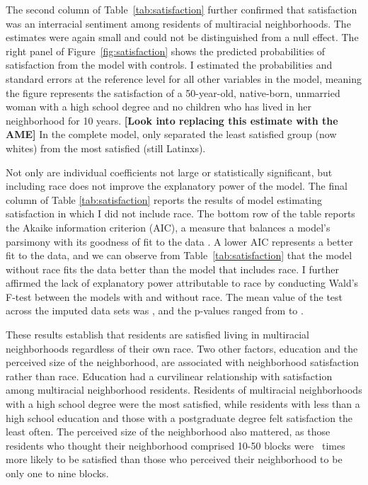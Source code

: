 \documentclass{baderart}
\begin{document}

The second column of Table~\ref{tab:satisfaction} further confirmed that satisfaction was an interracial sentiment among residents of multiracial neighborhoods. The estimates were again small and could not be distinguished from a null effect. The right panel of Figure~\ref{fig:satisfaction} shows the predicted probabilities of satisfaction from the model with controls. I estimated the probabilities and standard errors at the reference level for all other variables in the model, meaning the figure represents the satisfaction of a 50-year-old, native-born, unmarried woman with a high school degree and no children who has lived in her neighborhood for 10 years. \textbf{{[}Look into replacing this estimate with the AME{]}} In the complete model, only \maxdiffthree separated the least satisfied group (now whites) from the most satisfied (still Latinxs).

Not only are individual coefficients not large or statistically significant, but including race does not improve the explanatory power of the model. The final column of Table \ref{tab:satisfaction} reports the results of model estimating satisfaction in which I did not include race. The bottom row of the table reports the Akaike information criterion (AIC), a measure that balances a model's parsimony with its goodness of fit to the data \citep{akaike_new_1974}. A lower AIC represents a better fit to the data, and we can observe from Table~\ref{tab:satisfaction} that the model without race fits the data better than the model that includes race. I further affirmed the lack of explanatory power attributable to race by conducting Wald's F-test between the models with and without race. The mean value of the test across the imputed data sets was \satWaldF, and the p-values ranged from \satWaldpMin to \satWaldpMax.

These results establish that residents are satisfied living in multiracial neighborhoods regardless of their own race. Two other factors, education and the perceived size of the neighborhood, are associated with neighborhood satisfaction rather than race. Education had a curvilinear relationship with satisfaction among multiracial neighborhood residents. Residents of multiracial neighborhoods with a high school degree were the most satisfied, while residents with less than a high school education and those with a postgraduate degree felt satisfaction the least often. The perceived size of the neighborhood also mattered, as those residents who thought their neighborhood comprised 10-50 blocks were \satnhdsize\ times more likely to be satisfied than those who perceived their neighborhood to be only one to nine blocks. 
\end{document}
